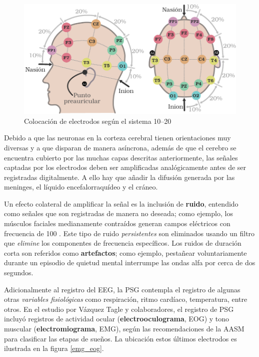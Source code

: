 \begin{figure}
\centering
\includegraphics[width=\linewidth]{./img_diagramas/cabeza_proporcionada_color_v4.pdf} 
\caption{Colocación de electrodos según el sistema 10--20}
\label{img1020}
\end{figure}

Debido a que las neuronas en la corteza cerebral tienen orientaciones muy diversas y a que disparan 
de manera asíncrona, además de que el cerebro se encuentra cubierto por las muchas capas descritas
anteriormente, las señales captadas por los electrodos deben ser amplificadas analógicamente antes 
de ser registradas digitalmente.
%
A ello hay que añadir la difusión generada por las meninges, el líquido encefalorraquídeo y el 
cráneo.

Un efecto colateral de amplificar la señal es la inclusión de \textbf{ruido}, entendido como 
señales que son registradas de manera no deseada; como ejemplo, los músculos faciales medianamente 
contraídos generan campos eléctricos con frecuencia de 100 \hz.
%
Este tipo de ruido \textit{persistentes} son eliminados usando un filtro que \textit{elimine} los 
componentes de frecuencia específicos.
%
Los ruidos de duración corta son referidos como \textbf{artefactos}; como ejemplo, pestañear 
voluntariamente durante un episodio de quietud mental interrumpe las ondas alfa por cerca de dos 
segundos. 

Adicionalmente al registro del EEG, la PSG contempla el registro de algunas otras \textit{variables 
fisiológicas} como respiración, ritmo cardíaco, temperatura, entre otros. 
%
En el estudio por Vázquez Tagle y colaboradores, el registro de PSG incluyó registros de actividad 
ocular (\textbf{electrooculograma}, EOG) y tono muscular (\textbf{electromiograma}, EMG), según las 
recomendaciones de la AASM para clasificar las etapas de sueños. La ubicación estos últimos 
electrodos es ilustrada en la figura \ref{emg_eog}.

